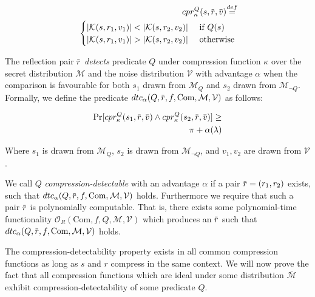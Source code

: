 \documentclass[conference, letterpaper, 10pt]{IEEEtran}
\newcommand\defeq{\stackrel{\mathclap{\normalfont\mbox{def}}}{=}}
\newcommand{\overbar}[1]{\mkern 1.5mu\overline{\mkern-1.5mu#1\mkern-1.5mu}\mkern 1.5mu}
\begin{document}
\begin{equation*}
\begin{split}
    cpr^Q_{\kappa}(s, \overbar{r}, \overbar{v})
    \defeq\\
    \begin{cases}
        |\mathcal{K}(s, r_1, v_1)| < |\mathcal{K}(s, r_2, v_2)| &\text{ if } Q(s)\\
        |\mathcal{K}(s, r_1, v_1)| > |\mathcal{K}(s, r_2, v_2)| &\text{ otherwise}
    \end{cases}
\end{split}
\end{equation*}

The reflection pair $\overbar{r}$ \textit{detects} predicate $Q$ under
compression function $\kappa$ over the secret distribution $\mathcal{M}$ and
the noise distribution $\mathcal{V}$ with advantage $\alpha$ when the
comparison is favourable for both $s_1$ drawn from $\mathcal{M}_Q$ and $s_2$
drawn from $\mathcal{M}_{\lnot Q}$. Formally, we define the predicate
$dtc_\alpha(Q, \overbar{r}, f, \textrm{Com}, \mathcal{M}, \mathcal{V})$ as follows:

\begin{align*}
    \Pr
        [cpr^Q_{\kappa}(s_1, \overbar{r}, \overbar{v}) \land
         cpr^Q_{\kappa}(s_2, \overbar{r}, \overbar{v})]
    \geq\\
    \pi + \alpha(\lambda)
\end{align*}

Where $s_1$ is drawn from $\mathcal{M}_Q$, $s_2$ is drawn from
$\mathcal{M}_{\lnot Q}$, and $v_1, v_2$ are drawn from $\mathcal{V}$.

We call $Q$ \textit{compression-detectable} with an advantage $\alpha$ if a
pair $\overbar{r} = (r_1, r_2)$ exists, such that $dtc_\alpha(Q, \overbar{r},
f, \textrm{Com}, \mathcal{M}, \mathcal{V})$ holds. Furthermore we require that such a
pair $\overbar{r}$ is polynomially computable. That is, there exists some
polynomial-time functionality $\mathcal{O}_R(\textrm{Com}, f, Q, \mathcal{M},
\mathcal{V})$ which produces an $\overbar{r}$ such that $dtc_\alpha(Q,
\overbar{r}, f, \textrm{Com}, \mathcal{M}, \mathcal{V})$ holds.

The compression-detectability property exists in all common compression
functions as long as $s$ and $r$ compress in the same context. We will now
prove the fact that all compression functions which are ideal under some
distribution $\bar{\mathcal{M}}$ exhibit compression-detectability of some
predicate $Q$.
\end{document}
